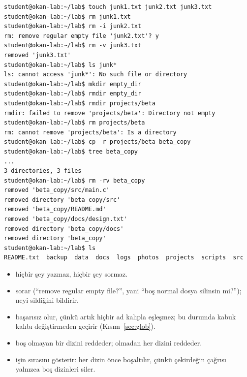 \begin{lstlisting}[style=term]
student@okan-lab:~/lab$ touch junk1.txt junk2.txt junk3.txt
student@okan-lab:~/lab$ rm junk1.txt
student@okan-lab:~/lab$ rm -i junk2.txt
rm: remove regular empty file 'junk2.txt'? y
student@okan-lab:~/lab$ rm -v junk3.txt
removed 'junk3.txt'
student@okan-lab:~/lab$ ls junk*
ls: cannot access 'junk*': No such file or directory
student@okan-lab:~/lab$ mkdir empty_dir
student@okan-lab:~/lab$ rmdir empty_dir
student@okan-lab:~/lab$ rmdir projects/beta
rmdir: failed to remove 'projects/beta': Directory not empty
student@okan-lab:~/lab$ rm projects/beta
rm: cannot remove 'projects/beta': Is a directory
student@okan-lab:~/lab$ cp -r projects/beta beta_copy
student@okan-lab:~/lab$ tree beta_copy
...
3 directories, 3 files
student@okan-lab:~/lab$ rm -rv beta_copy
removed 'beta_copy/src/main.c'
removed directory 'beta_copy/src'
removed 'beta_copy/README.md'
removed 'beta_copy/docs/design.txt'
removed directory 'beta_copy/docs'
removed directory 'beta_copy'
student@okan-lab:~/lab$ ls
README.txt  backup  data  docs  logs  photos  projects  scripts  src
\end{lstlisting}

\begin{itemize}
  \item {} hiçbir şey yazmaz, hiçbir şey sormaz.
  \item {} sorar (``remove regular empty file?'', yani ``boş normal dosya silinsin mi?'');  neyi sildiğini bildirir.
  \item {} başarısız olur, çünkü artık hiçbir ad kalıpla eşleşmez; bu durumda kabuk kalıbı değiştirmeden geçirir (Kısım~\ref{sec:glob}).
  \item {} boş olmayan bir dizini reddeder;  olmadan  her dizini reddeder.
  \item {} işin sırasını gösterir: her dizin önce boşaltılır, çünkü çekirdeğin  çağrısı yalnızca boş dizinleri siler.
\end{itemize}

